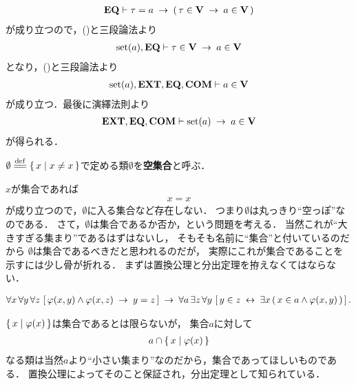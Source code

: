 \begin{prf}
\begin{align}
			\mbox{{\bf EQ}} \vdash \tau = a \hspace{0.25em}\rightarrow\hspace{0.25em} (\, \tau \in \mathbf{V} \hspace{0.25em}\rightarrow\hspace{0.25em} a \in \mathbf{V}\, )
		\end{align}
		が成り立つので，()と三段論法より
		\begin{align}
			\operatorname*{set} (a),\mbox{{\bf EQ}} \vdash \tau \in \mathbf{V} \hspace{0.25em}\rightarrow\hspace{0.25em} a \in \mathbf{V}
		\end{align}
		となり，()と三段論法より
		\begin{align}
			\operatorname*{set} (a),\mbox{{\bf EXT}},\mbox{{\bf EQ}},\mbox{\bf COM} \vdash a \in \mathbf{V}
		\end{align}
		が成り立つ．最後に演繹法則より
		\begin{align}
			\mbox{{\bf EXT}},\mbox{{\bf EQ}},\mbox{\bf COM} \vdash \operatorname*{set} (a) \hspace{0.25em}\rightarrow\hspace{0.25em} a \in \mathbf{V}
		\end{align}
		が得られる．
		\QED
	\end{prf}
	
	\begin{screen}
		\begin{dfn}[空集合]
			$\emptyset \defeq \Set{x}{x \neq x}$で定める類$\emptyset$を{\bf 空集合}と呼ぶ．
		\end{dfn}
	\end{screen}
	
	$x$が集合であれば
	\begin{align}
		x = x
	\end{align}
	が成り立つので，$\emptyset$に入る集合など存在しない．
	つまり$\emptyset$は丸っきり``空っぽ''なのである．
	さて，$\emptyset$は集合であるか否か，という問題を考える．
	当然これが``大きすぎる集まり''であるはずはないし，
	そもそも名前に``集合''と付いているのだから
	$\emptyset$は集合であるべきだと思われるのだが，
	実際にこれが集合であることを示すには少し骨が折れる．
	まずは置換公理と分出定理を拵えなくてはならない．
	
	\begin{screen}
		\begin{axm}[置換公理]
			\begin{align}
				\forall x\, \forall y\, \forall z\, 
				\left[\, \varphi(x,y) \wedge \varphi(x,z)
				\hspace{0.25em}\rightarrow\hspace{0.25em} y = z\, \right]
				\hspace{0.25em}\rightarrow\hspace{0.25em} \forall a\, \exists z\, \forall y\,
				\left[\, y \in z \hspace{0.25em}\leftrightarrow\hspace{0.25em} \exists x\, (\, x \in a \wedge 
				\varphi(x,y)\, )\, \right].
			\end{align}
		\end{axm}
	\end{screen}
	
	$\left\{\, x \mid \varphi(x)\, \right\}$は集合であるとは限らないが，
	集合$a$に対して
	\begin{align}
		a \cap \left\{\, x \mid \varphi(x)\, \right\}
	\end{align}
	なる類は当然$a$より``小さい集まり''なのだから，集合であってほしいものである．
	置換公理によってそのこと保証され，分出定理として知られている．
	
